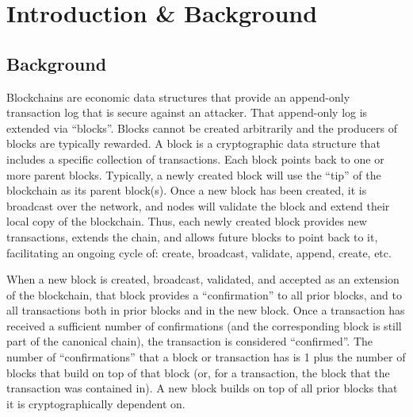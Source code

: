 \documentclass[a4paper,]{article}
\title{\titleOfDoc}
\author{Max Kaye}
\date{
  Currently in draft \\
  Last Updated: 2022-05-09 \\
  (Note: ``??'' indicates a link to something in the WP --- not included here.)
}
\begin{document}
\maketitle

\begin{abstract}

\end{abstract}

{
\setcounter{tocdepth}{1}
\tableofcontents
}


\section{Introduction \& Background}

\subsection{Background}

Blockchains are economic data structures that provide an append-only transaction log that is secure against an attacker.
That append-only log is extended via ``blocks''.
Blocks cannot be created arbitrarily and the producers of blocks are typically rewarded.
A block is a cryptographic data structure that includes a specific collection of transactions.
Each block points back to one or more parent blocks.
Typically, a newly created block will use the ``tip'' of the blockchain as its parent block(s).
Once a new block has been created, it is broadcast over the network, and nodes will validate the block and extend their local copy of the blockchain.
Thus, each newly created block provides new transactions, extends the chain, and allows future blocks to point back to it, facilitating an ongoing cycle of: create, broadcast, validate, append, create, etc.

When a new block is created, broadcast, validated, and accepted as an extension of the blockchain, that block provides a ``confirmation'' to all prior blocks, and to all transactions both in prior blocks and in the new block.
Once a transaction has received a sufficient number of confirmations (and the corresponding block is still part of the canonical chain), the transaction is considered ``confirmed''.
The number of ``confirmations'' that a block or transaction has is 1 plus the number of blocks that build on top of that block (or, for a transaction, the block that the transaction was contained in).
A new block builds on top of all prior blocks that it is cryptographically dependent on.
\end{document}
